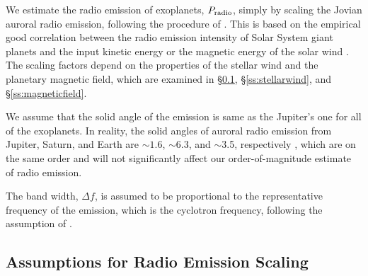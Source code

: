 \documentclass{emulateapj}
\begin{document}
We estimate the radio emission of exoplanets, $P_{\rm radio}$, simply by scaling the Jovian auroral radio emission, following the procedure of \citet{griebmeier2007}. 
This is based on the empirical good correlation between the radio emission intensity of Solar System giant planets and the input kinetic energy or the magnetic energy of the solar wind \citep[``radio Bode's law''; ][]{desch+kaiser1984}. 
The scaling factors depend on the properties of the stellar wind and the planetary magnetic field, which are examined in \S\ref{ss:mechanisms}, \S\ref{ss:stellarwind}, and \S\ref{ss:magneticfield}. 

We assume that the solid angle of the emission is same as the Jupiter's one for all of the exoplanets. In reality, the solid angles of auroral radio emission from  Jupiter, Saturn, and Earth are $\sim 1.6$, $\sim $6.3, and $\sim $3.5, respectively \citep{desch+kaiser1984}, which are on the same order and will not significantly affect our order-of-magnitude estimate of radio emission. 

The band width, $\Delta f$, is assumed to be proportional to the representative frequency of the emission, which is the cyclotron frequency, following the assumption of \citet{griebmeier2007}. 


\subsection{Assumptions for Radio Emission Scaling}
\label{ss:mechanisms}
\end{document}
